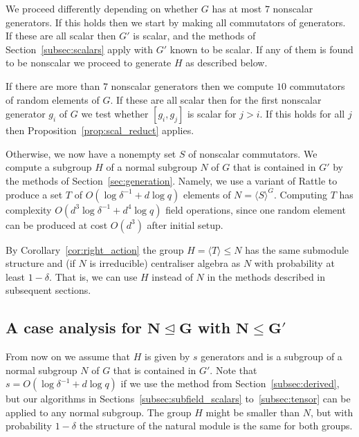 
We proceed differently depending on whether $G$ has at most $7$ 
nonscalar generators. If this holds then we start by making all 
commutators of generators. If these are all scalar then $G'$ is 
scalar, and the methods of Section~\ref{subsec:scalars} apply with $G'$ known to be scalar. If any of them is found to be nonscalar we proceed to generate $H$ as described below.

If there are more than $7$ nonscalar generators then we compute $10$
commutators of random elements of $G$. If these are all scalar 
then for the first nonscalar generator $g_i$ of $G$ we test 
whether $[g_i, g_j]$ is scalar for $j > i$. If this holds for 
all $j$ then Proposition~\ref{prop:scal_reduct} applies. 

Otherwise, we now have a nonempty set $S$ of nonscalar commutators. We 
compute a subgroup $H$ of a normal subgroup $N$ of $G$ 
that is contained in $G'$ by 
 the methods of Section~\ref{sec:generation}. 
Namely,  we use a variant of Rattle \cite{LGMurray, LGO97} to 
produce a set $T$ of $O(\log \delta^{-1} + d \log q)$ elements of 
$N = \langle S \rangle^G$. Computing $T$ has complexity 
$O(d^3 \log \delta^{-1} + d^4 \log q)$ 
field operations, since one random element can be produced
at cost $O(d^3)$ after initial setup.

By Corollary~\ref{cor:right_action} 
the group $H = \langle T \rangle \leq N$  has the 
same submodule structure and (if $N$ is irreducible) centraliser algebra 
as $N$ with probability at least $1 -
\delta$. That is, we can use $H$ instead of
$N$ in the methods described in subsequent sections.


\subsection{A case analysis for $\mathbf{N \unlhd G}$ with
$\mathbf{N \leq G'}$}
\label{subsec:caseanalysis}

{} From now on we assume that $H$ is given by $s$ generators 
and is a subgroup of a normal subgroup $N$ of $G$ that is
contained in $G'$.  Note that
$s = O(\log \delta^{-1} + d \log q)$ if we use the method from
Section~\ref{subsec:derived}, but our algorithms in 
Sections~\ref{subsec:subfield_scalars} to~\ref{subsec:tensor} can be applied 
to any normal subgroup. The group $H$ might be smaller than $N$, but with 
probability $1-\delta$ the structure of the natural module is the same for both
groups. 

